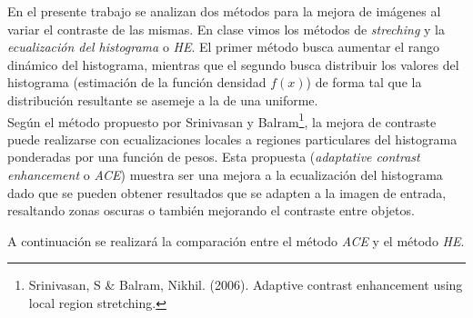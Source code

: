 
En el presente trabajo se analizan dos métodos para la mejora de imágenes
al variar el contraste de las mismas. En clase vimos los métodos de
\emph{streching} y la \emph{ecualización del histograma} o \emph{HE}. El primer
método busca aumentar el rango dinámico del histograma, mientras que el segundo
busca distribuir los valores del histograma (estimación de la función densidad
$f(x)$) de forma tal que la distribución resultante se asemeje a la de una
uniforme. \\

Según el método propuesto por Srinivasan y Balram\footnote{Srinivasan, S
\& Balram, Nikhil. (2006). Adaptive contrast enhancement using local region
stretching.}, la mejora de contraste puede realizarse con ecualizaciones
locales a regiones particulares del histograma ponderadas por una función de
pesos. Esta propuesta (\emph{adaptative contrast enhancement} o \emph{ACE})
muestra ser una mejora a la ecualización del histograma dado que se pueden
obtener resultados que se adapten a la imagen de entrada, resaltando zonas
oscuras o también mejorando el contraste entre objetos.

A continuación se realizará la comparación entre el método \emph{ACE} y el
método \emph{HE}.
